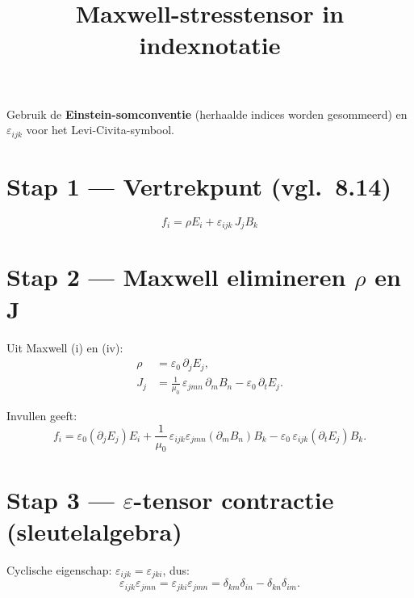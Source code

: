 \documentclass[12pt,a4paper]{article}
\title{Maxwell-stresstensor in indexnotatie}
\author{}
\date{}
\begin{document}
\maketitle

\noindent
Gebruik de \textbf{Einstein-somconventie} (herhaalde indices worden gesommeerd)
en $\varepsilon_{ijk}$ voor het Levi-Civita-symbool.

\section*{Stap 1 — Vertrekpunt (vgl.\ 8.14)}

\begin{equation}
    f_i = \rho E_i + \varepsilon_{ijk}\, J_j B_k
\end{equation}

\section*{Stap 2 — Maxwell elimineren $\rho$ en $\mathbf{J}$}

Uit Maxwell (i) en (iv):
\begin{align}
    \rho &= \varepsilon_0\,\partial_j E_j,\\[4pt]
    J_j  &= \frac{1}{\mu_0}\,\varepsilon_{jmn}\,\partial_m B_n
            - \varepsilon_0\,\partial_t E_j.
\end{align}

Invullen geeft:
\begin{equation}\label{eq:star}
    f_i = \varepsilon_0(\partial_j E_j)E_i
        + \frac{1}{\mu_0}\,\varepsilon_{ijk}\varepsilon_{jmn}(\partial_m B_n)B_k
        - \varepsilon_0\,\varepsilon_{ijk}(\partial_t E_j)B_k.
    \tag{$*$}
\end{equation}

\section*{Stap 3 — $\varepsilon$-tensor contractie (sleutelalgebra)}

Cyclische eigenschap: $\varepsilon_{ijk} = \varepsilon_{jki}$, dus:
\begin{equation}
    \varepsilon_{ijk}\varepsilon_{jmn}
    = \varepsilon_{jki}\varepsilon_{jmn}
    = \delta_{km}\delta_{in} - \delta_{kn}\delta_{im}.
\end{equation}
\end{document}
